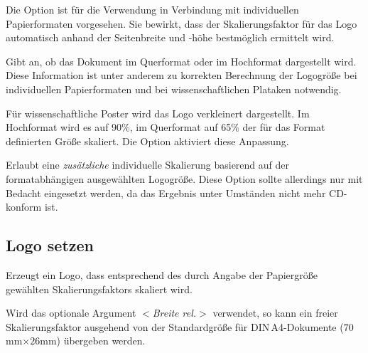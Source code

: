 \begin{Declaration}
\end{Declaration}
Die Option  ist für die Verwendung in Verbindung mit
individuellen Papierformaten vorgesehen.
Sie bewirkt, dass der Skalierungsfaktor für das Logo automatisch anhand
der Seitenbreite und -höhe bestmöglich ermittelt wird.

\begin{Declaration}
\end{Declaration}
Gibt an, ob das Dokument im Querformat oder im Hochformat dargestellt wird.
Diese Information ist unter anderem zu korrekten Berechnung der Logogröße
bei individuellen Papierformaten und bei wissenschaftlichen Plataken notwendig.

\begin{Declaration}
\end{Declaration}
Für wissenschaftliche Poster wird das Logo verkleinert dargestellt.
Im Hochformat wird es auf 90\%, im Querformat auf 65\% der für das Format
definierten Größe skaliert.
Die Option  aktiviert diese Anpassung.


\begin{Declaration}
\end{Declaration}

Erlaubt eine \emph{zusätzliche} individuelle Skalierung basierend auf
der formatabhängigen ausgewählten Logogröße. Diese Option sollte allerdings
nur mit Bedacht eingesetzt werden, da das Ergebnis unter Umständen nicht mehr
CD-konform ist.

\subsection{Logo setzen}\label{options:papersize}

\begin{Declaration}
\end{Declaration}\label{cmd:tubslogo}

Erzeugt ein Logo, dass entsprechend des durch Angabe der Papiergröße
gewählten Skalierungsfaktors skaliert wird.

Wird das optionale Argument {\sffamily\itshape $<$Breite rel.$>$}
verwendet, so kann ein freier Skalierungsfaktor ausgehend von der
Standardgröße für \mbox{DIN\,A4}-Dokumente ($70$mm$\times 26$mm) übergeben werden.

